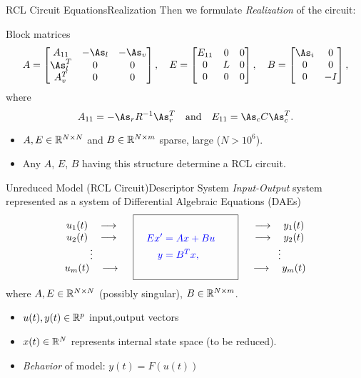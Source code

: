 \documentclass{beamer}
\newcommand{\Balert}[1]{\textcolor{blue}{#1}}
\begin{document}
\begin{frame}{RCL Circuit Equations}{Realization}
Then we formulate \emph{Realization} of the circuit: 
\bigskip

Block matrices
\[
A = \mat{A_{11}& -\As_l&-\As_v\\ \As^T_l &0&0\\A^T_v&0&0}, \quad
 E= \mat{E_{11}&0&0\\ 0&L&0\\ 0&0&0}, \quad
 B = \mat{\As_i&0\\ 0&0\\ 0&-I},
\]
where 
\[
A_{11}= -\As_r R^{-1}\As_r^T \quad\text{and}\quad E_{11} = \As_c C\As_c^T.
\]

\begin{itemize}
\item $A,E\in\mathbb{R}^{N\times N}$ and $B\in\mathbb{R}^{N\times m}$ sparse, large ($N > 10^6$).
\item Any $A$, $E$, $B$ having this structure determine a RCL circuit.
\end{itemize}

\end{frame}




\begin{frame}{Unreduced Model (RCL Circuit)}{Descriptor System}
   \emph{Input-Output} system represented as a system of 
   Differential Algebraic Equations (DAEs)
   \begin{equation*}  
   \begin{array}{c}
   u_1(t)\quad\longrightarrow \\ u_2(t)\quad\longrightarrow\\ \vdots\\u_\nin(t)\quad\longrightarrow
   \end{array}
  \quad
  \boxed{\Balert{%
 	\begin{aligned}
 	    \\
 			\quad E x' &=  Ax + Bu\quad\\
 			y &= B^Tx,\\
 			\\
 	\end{aligned}		
      }
	}
  \quad	
		 \begin{array}{c}
	 \longrightarrow\quad y_1(t)\\ \longrightarrow\quad y_2(t)\\ \vdots\\\longrightarrow\quad y_\nin(t)
   \end{array} 
 \end{equation*}
 where $A,E\in\mathbb{R}^{N\times N}$ (possibly singular), $B\in\mathbb{R}^{N\times m}$.
 
 \begin{itemize}
   \item $u(t),y(t)\in\mathbb{R}^p$ input,output vectors
   \item $x(t)\in\mathbb{R}^N$ represents internal state space (to be reduced).
  \item \emph{Behavior} of model: \alert{$y(t)=F(u(t))$}
   \end{itemize}
 \end{frame}
\end{document}
